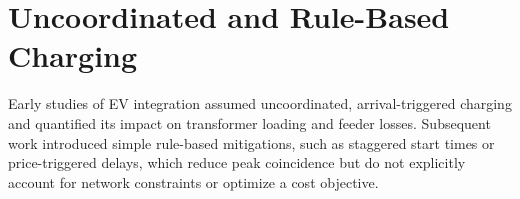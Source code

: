 \section{Uncoordinated and Rule-Based Charging}
Early studies of EV integration assumed uncoordinated, arrival-triggered charging and
quantified its impact on transformer loading and feeder losses. Subsequent work introduced
simple rule-based mitigations, such as staggered start times or price-triggered delays, which
reduce peak coincidence but do not explicitly account for network constraints or optimize a
cost objective.
